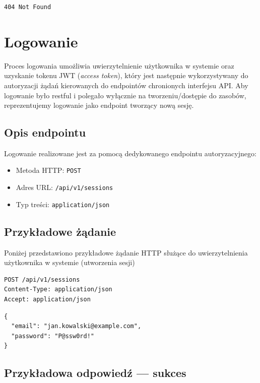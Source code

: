 \documentclass[11pt, a4paper]{article}
\begin{document}
\begin{lstlisting}[style=http,caption={Odpowiedź HTTP — nieudana rejestracja}]
404 Not Found
\end{lstlisting}

\section{Logowanie}

Proces logowania umożliwia uwierzytelnienie użytkownika w systemie oraz uzyskanie
tokenu JWT (\textit{access token}), który jest następnie wykorzystywany do
autoryzacji żądań kierowanych do endpointów chronionych interfejsu API. Aby logowanie było restful i polegało wyłącznie na tworzeniu/dostępie do zasobów, reprezentujemy logowanie jako endpoint tworzący nową sesję. 

\subsection{Opis endpointu}

Logowanie realizowane jest za pomocą dedykowanego endpointu autoryzacyjnego:

\begin{itemize}
    \item Metoda HTTP: \texttt{POST}
    \item Adres URL: \texttt{/api/v1/sessions}
    \item Typ treści: \texttt{application/json}
\end{itemize}

\subsection{Przykładowe żądanie}

Poniżej przedstawiono przykładowe żądanie HTTP służące do uwierzytelnienia
użytkownika w systemie (utworzenia sesji)

\begin{lstlisting}[style=http,caption={Przykładowe żądanie logowania}]
POST /api/v1/sessions
Content-Type: application/json
Accept: application/json
\end{lstlisting}

\begin{lstlisting}[style=json,caption={Ciało żądania logowania}]
{
  "email": "jan.kowalski@example.com",
  "password": "P@ssw0rd!"
}
\end{lstlisting}

\subsection{Przykładowa odpowiedź — sukces}
\end{document}
